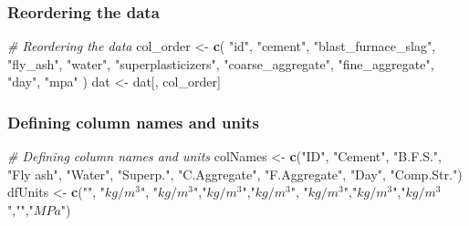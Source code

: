 \documentclass[
]{article}
\newenvironment{Shaded}{\begin{snugshade}}{\end{snugshade}}
\newcommand{\CommentTok}[1]{\textcolor[rgb]{0.56,0.35,0.01}{\textit{#1}}}
\newcommand{\KeywordTok}[1]{\textcolor[rgb]{0.13,0.29,0.53}{\textbf{#1}}}
\newcommand{\NormalTok}[1]{#1}
\newcommand{\StringTok}[1]{\textcolor[rgb]{0.31,0.60,0.02}{#1}}
\begin{document}
\hypertarget{reordering-the-data}{%
\subsubsection{Reordering the data}\label{reordering-the-data}}

\label{show-reorder-dat}

\begin{Shaded}
\begin{Highlighting}[]
\CommentTok{# Reordering the data}
\NormalTok{col_order <-}\StringTok{ }\KeywordTok{c}\NormalTok{(}
  \StringTok{"id"}\NormalTok{,}
  \StringTok{"cement"}\NormalTok{,}
  \StringTok{"blast_furnace_slag"}\NormalTok{,}
  \StringTok{"fly_ash"}\NormalTok{,}
  \StringTok{"water"}\NormalTok{,}
  \StringTok{"superplasticizers"}\NormalTok{,}
  \StringTok{"coarse_aggregate"}\NormalTok{,}
  \StringTok{"fine_aggregate"}\NormalTok{,}
  \StringTok{"day"}\NormalTok{,}
  \StringTok{"mpa"}
\NormalTok{)}
\NormalTok{dat <-}\StringTok{ }\NormalTok{dat[, col_order]}
\end{Highlighting}
\end{Shaded}

\hypertarget{defining-column-names-and-units}{%
\subsubsection{Defining column names and
units}\label{defining-column-names-and-units}}

\label{show-col-names-and-units}

\begin{Shaded}
\begin{Highlighting}[]
\CommentTok{# Defining column names and units}
\NormalTok{colNames <-}\StringTok{ }\KeywordTok{c}\NormalTok{(}\StringTok{"ID"}\NormalTok{, }\StringTok{"Cement"}\NormalTok{, }\StringTok{"B.F.S."}\NormalTok{, }\StringTok{"Fly ash"}\NormalTok{, }\StringTok{"Water"}\NormalTok{,}
             \StringTok{"Superp."}\NormalTok{, }\StringTok{"C.Aggregate"}\NormalTok{, }\StringTok{"F.Aggregate"}\NormalTok{, }\StringTok{"Day"}\NormalTok{, }\StringTok{"Comp.Str."}\NormalTok{)}
\NormalTok{dfUnits <-}\StringTok{ }\KeywordTok{c}\NormalTok{(}\StringTok{""}\NormalTok{, }\StringTok{"$kg/m^3$"}\NormalTok{, }\StringTok{"$kg/m^3$"}\NormalTok{,}\StringTok{"$kg/m^3$"}\NormalTok{,}\StringTok{"$kg/m^3$"}\NormalTok{,}
             \StringTok{"$kg/m^3$"}\NormalTok{,}\StringTok{"$kg/m^3$"}\NormalTok{,}\StringTok{"$kg/m^3$"}\NormalTok{,}\StringTok{""}\NormalTok{,}\StringTok{"$MPa$"}\NormalTok{)}
\end{Highlighting}
\end{Shaded}
\end{document}
